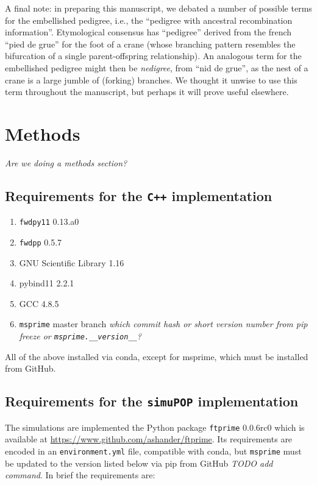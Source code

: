 \documentclass{article}
\newcommand{\simupop}{\texttt{simuPOP}}
\newcommand{\fwdpp}{\texttt{fwdpp}}
\newcommand{\fwdpy}{\texttt{fwdpy11}}
\newcommand{\cpp}{\texttt{C++}}
\newcommand{\msprime}{\texttt{msprime}}
\newcommand{\ftprime}{\texttt{ftprime}}
\newcommand{\krt}[1]{{\em \color{green} #1}}
\newcommand{\jda}[1]{{\em \color{cyan} #1}}
\begin{document}
A final note:
in preparing this manuscript,
we debated a number of possible terms for the embellished pedigree,
i.e., the ``pedigree with ancestral recombination information''.
Etymological consensus \citep{liberman2014little} has
``pedigree'' derived from the french ``pied de grue'' for the foot of a crane
(whose branching pattern resembles the bifurcation of a single parent-offspring relationship).
An analogous term for the embellished pedigree might then be \emph{nedigree},
from ``nid de grue'',
as the nest of a crane is a large jumble of (forking) branches.
We thought it unwise to use this term throughout the manuscript,
but perhaps it will prove useful elsewhere.


\section*{Methods}

\krt{Are we doing a methods section?}

\subsection{Requirements for the \cpp{} implementation}

\begin{enumerate}
    \item \fwdpy{} 0.13.a0
    \item \fwdpp{} 0.5.7
    \item GNU Scientific Library 1.16
    \item pybind11 2.2.1
    \item GCC 4.8.5
    \item \msprime{} master branch \jda{which commit hash or short version number
		    from pip freeze or {\tt msprime.\_\_version\_\_}?}
\end{enumerate}

All of the above installed via conda, except for msprime, which must be installed from GitHub.

\subsection{Requirements for the \simupop{} implementation}

The simulations are implemented the Python package \ftprime{} 0.0.6rc0
which is available at \url{https://www.github.com/ashander/ftprime}.
Its requirements are encoded in an \texttt{environment.yml} file, compatible
with conda, but \msprime{} must be updated to the version listed below via pip
from GitHub \jda{TODO add command}.
In brief the requirements are:
\end{document}
